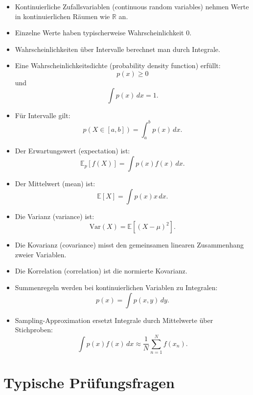 \begin{itemize}
    \item Kontinuierliche Zufallsvariablen (continuous random variables) nehmen Werte in kontinuierlichen Räumen wie \(\mathbb{R}\) an.
    \item Einzelne Werte haben typischerweise Wahrscheinlichkeit \(0\).
    \item Wahrscheinlichkeiten über Intervalle berechnet man durch Integrale.
    \item Eine Wahrscheinlichkeitsdichte (probability density function) erfüllt:
    \[
        p(x) \geq 0
    \]
    und
    \[
        \int p(x)\,dx = 1.
    \]
    \item Für Intervalle gilt:
    \[
        p(X \in [a,b])
        =
        \int_a^b p(x)\,dx.
    \]
    \item Der Erwartungswert (expectation) ist:
    \[
        \mathbb{E}_p[f(X)]
        =
        \int p(x)f(x)\,dx.
    \]
    \item Der Mittelwert (mean) ist:
    \[
        \mathbb{E}[X]
        =
        \int p(x)x\,dx.
    \]
    \item Die Varianz (variance) ist:
    \[
        \mathrm{Var}(X)
        =
        \mathbb{E}\left[(X-\mu)^2\right].
    \]
    \item Die Kovarianz (covariance) misst den gemeinsamen linearen Zusammenhang zweier Variablen.
    \item Die Korrelation (correlation) ist die normierte Kovarianz.
    \item Summenregeln werden bei kontinuierlichen Variablen zu Integralen:
    \[
        p(x)
        =
        \int p(x,y)\,dy.
    \]
    \item Sampling-Approximation ersetzt Integrale durch Mittelwerte über Stichproben:
    \[
        \int p(x)f(x)\,dx
        \approx
        \frac{1}{N}
        \sum_{n=1}^{N}
        f(x_n).
    \]
\end{itemize}

\section{Typische Prüfungsfragen}

